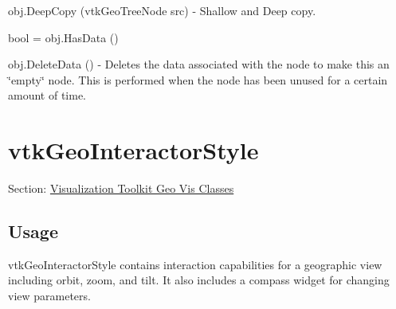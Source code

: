 \begin{DoxyItemize}
\item {\ttfamily obj.\-Deep\-Copy (vtk\-Geo\-Tree\-Node src)} -\/ Shallow and Deep copy.  
\item {\ttfamily bool = obj.\-Has\-Data ()}  
\item {\ttfamily obj.\-Delete\-Data ()} -\/ Deletes the data associated with the node to make this an \char`\"{}empty\char`\"{} node. This is performed when the node has been unused for a certain amount of time.  
\end{DoxyItemize}\hypertarget{vtkgeovis_vtkgeointeractorstyle}{}\section{vtk\-Geo\-Interactor\-Style}\label{vtkgeovis_vtkgeointeractorstyle}
Section\-: \hyperlink{sec_vtkgeovis}{Visualization Toolkit Geo Vis Classes} \hypertarget{vtkwidgets_vtkxyplotwidget_Usage}{}\subsection{Usage}\label{vtkwidgets_vtkxyplotwidget_Usage}
vtk\-Geo\-Interactor\-Style contains interaction capabilities for a geographic view including orbit, zoom, and tilt. It also includes a compass widget for changing view parameters.

